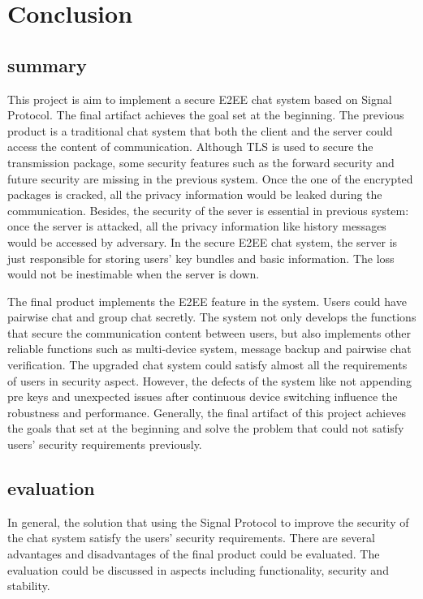 \section{Conclusion}

\subsection{summary}
This project is aim to implement a secure E2EE chat system based on Signal Protocol. The final artifact achieves the goal set at the beginning. The previous product is a traditional chat system that both the client and the server could access the content of communication. Although TLS is used to secure the transmission package, some security features such as the forward security and future security are missing in the previous system. Once the one of the encrypted packages is cracked, all the privacy information would be leaked during the communication. Besides, the security of the sever is essential in previous system: once the server is attacked, all the privacy information like history messages would be accessed by adversary. In the secure E2EE chat system, the server is just responsible for storing users' key bundles and basic information. The loss would not be inestimable when the server is down.

The final product implements the E2EE feature in the system. Users could have pairwise chat and group chat secretly. The system not only develops the functions that secure the communication content between users, but also implements other reliable functions such as multi-device system, message backup and pairwise chat verification. The upgraded chat system could satisfy almost all the requirements of users in security aspect. However, the defects of the system like not appending pre keys and unexpected issues after continuous device switching influence the robustness and performance. Generally, the final artifact of this project achieves the goals that set at the beginning and solve the problem that could not satisfy users' security requirements previously.

\subsection{evaluation}
In general, the solution that using the Signal Protocol to improve the security of the chat system satisfy the users' security requirements. There are several advantages and disadvantages of the final product could be evaluated. The evaluation could be discussed in aspects including functionality, security and stability.

